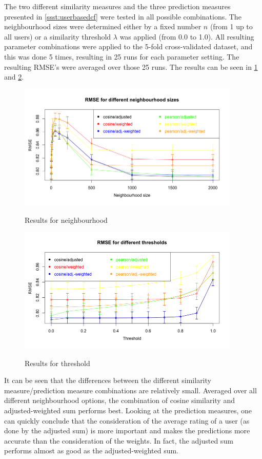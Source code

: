 The two different similarity measures and the three prediction measures presented in \ref{ssst:userbasedcf} were tested in all possible combinations. The neighbourhood sizes were determined either by a fixed number $n$ (from 1 up to all users) or a similarity threshold $\lambda$ was applied (from 0.0 to 1.0). All resulting parameter combinations were applied to the 5-fold cross-validated dataset, and this was done 5 times, resulting in 25 runs for each parameter setting. The resulting RMSE's were averaged over those 25 runs. The results can be seen in \ref{f:userbasedn} and \ref{f:userbasedt}.

\begin{figure}[!ht]
\centering
\includegraphics[width=400px]{./4-experiments/figures/USERBASED_N_V3.png}
\label{f:userbasedn}
\caption{Results for neighbourhood}
\end{figure}

\begin{figure}[!ht]
\includegraphics[width=400px]{./4-experiments/figures/USERBASED_T_V3.png}
\label{f:userbasedt}
\caption{Results for threshold}
\end{figure}

It can be seen that the differences between the different similarity measure/prediction measure combinations are relatively small. Averaged over all different neighbourhood options, the combination of cosine similarity and adjusted-weighted sum performs best. Looking at the prediction measures, one can quickly conclude that the consideration of the average rating of a user (as done by the adjusted sum) is more important and makes the predictions more accurate than the consideration of the weights. In fact, the adjusted sum performs almost as good as the adjusted-weighted sum.

